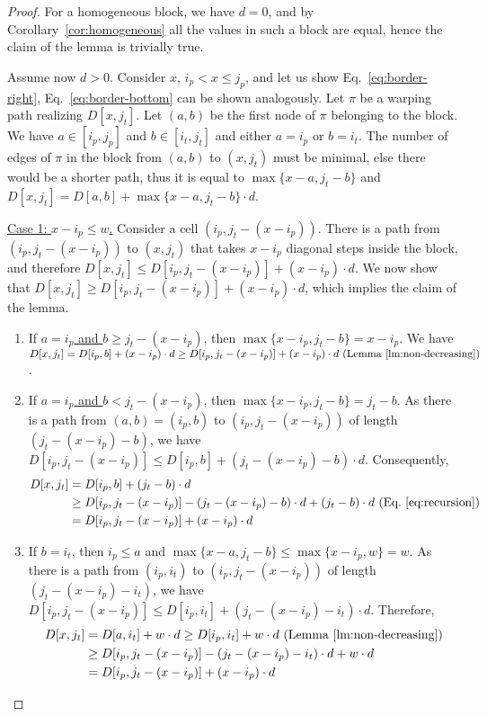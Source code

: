 \begin{proof}
For a homogeneous block, we have $d=0$, and by Corollary~\ref{cor:homogeneous} all the values in such a block are equal, hence the claim of the lemma is trivially true. 

Assume now $d > 0$. Consider $x$, $i_p < x \leq j_p$, and let us show Eq.~\ref{eq:border-right}, Eq.~\ref{eq:border-bottom} can be shown analogously. Let $\pi$ be a warping path realizing $D[x,j_t]$.
%
Let $(a,b)$ be the first node of $\pi$ belonging to the block.
We have $a \in [i_p,j_p]$ and $b \in [i_t,j_t]$ and either $a=i_p$ or $b=i_t$.
%
The number of edges of $\pi$ in the block from $(a,b)$ to $(x,j_t)$ must be minimal, else there would be a shorter path, thus it is equal to $\max\{x-a,j_t-b\}$ and $D[x,j_t]=D[a,b]+\max\{x-a,j_t-b\}\cdot d$.


\noindent
\underline{Case 1: $x-i_p \leq w$.} Consider a cell $(i_p,j_t - (x-i_p))$. There is a path from $(i_p,j_t - (x-i_p))$ to $(x,j_t)$ that takes $x-i_p$ diagonal steps inside the block, and therefore $D[x,j_t] \leq D[i_p,j_t - (x-i_p)]+(x-i_p)\cdot d$. We now show that $D[x,j_t] \geq D[i_p,j_t - (x-i_p)]+(x-i_p)\cdot d$, which implies the claim of the lemma.
\begin{enumerate}[label=(\alph*)]
\item If \underline{$a=i_p$ and $b \geq j_t - (x-i_p)$}, then $\max\{x-i_p,j_t-b\}=x-i_p$. We have $D[x,j_t] =D[i_p,b]+(x-i_p)\cdot d  \geq D[i_p,j_t - (x-i_p)]+(x-i_p)\cdot d \text{ (Lemma~\ref{lm:non-decreasing})}$.

\item If \underline{$a=i_p$ and $b < j_t - (x-i_p)$}, then $\max\{x-i_p,j_t-b\}=j_t-b$. As there is a path from $(a,b) = (i_p,b)$ to $(i_p,j_t - (x-i_p))$ of length $(j_t - (x-i_p)-b)$, we have $D[i_p,j_t - (x-i_p)] \le D[i_p,b] + (j_t - (x-i_p)-b) \cdot d$. Consequently,
\begin{align*}
D[x,j_t]&=D[i_p,b]+(j_t-b)\cdot d \\
& \geq D[i_p,j_t - (x-i_p)] - (j_t - (x-i_p)-b) \cdot d +(j_t-b) \cdot d \text{ (Eq.~\ref{eq:recursion})}\\
& = D[i_p,j_t - (x-i_p)]+(x-i_p)\cdot d
\end{align*}
\item If \underline{$b=i_t$}, then $i_p \leq a$ and $\max\{x-a, j_t-b\} \leq \max\{x-i_p,w\} = w$. As there is a path from $(i_p,i_t)$ to $(i_p,j_t - (x-i_p))$ of length $(j_t - (x-i_p)-i_t)$, we have $D[i_p,j_t - (x-i_p)] \le D[i_p,i_t] + (j_t - (x-i_p)-i_t) \cdot d$. Therefore, 
\begin{align*}
D[x,j_t]&=D[a,i_t]+w\cdot d \geq D[i_p,i_t] +w\cdot d \text{ (Lemma~\ref{lm:non-decreasing})} \\
& \geq D[i_p,j_t - (x-i_p)] - (j_t - (x-i_p)-i_t) \cdot d +w\cdot d\\
& = D[i_p,j_t - (x-i_p)]+(x-i_p)\cdot d
\end{align*}
\end{enumerate}


\end{proof}
